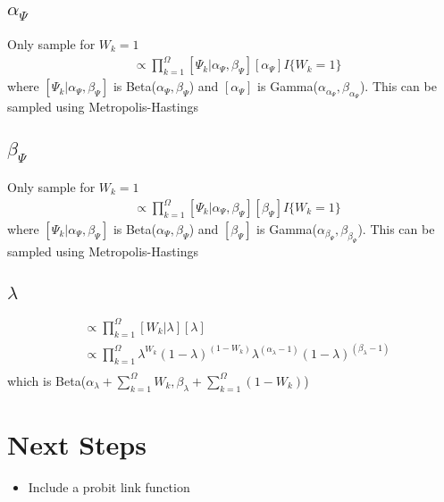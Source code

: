 \documentclass[fleqn]{article}
\begin{document}
\subsection{$\alpha_\Psi$}
%
Only sample for $W_k = 1$
%
\begin{align*}
  [\alpha_\Psi | \cdot] & \propto \prod_{k = 1}^\Omega [\Psi_k | \alpha_\Psi, \beta_\Psi] [\alpha_\Psi] I\{W_k = 1\}
\end{align*}
where $[\Psi_k | \alpha_\Psi, \beta_\Psi]$ is Beta($\alpha_\Psi, \beta_\Psi$) and $[\alpha_\Psi]$ is Gamma($\alpha_{\alpha_\Psi}, \beta_{\alpha_\Psi}$). This can be sampled using Metropolis-Hastings
%
\subsection{$\beta_\Psi$}
%
Only sample for $W_k = 1$
%
\begin{align*}
  [\beta_\Psi | \cdot] & \propto \prod_{k = 1}^\Omega [\Psi_k | \alpha_\Psi, \beta_\Psi] [\beta_\Psi] I\{W_k = 1\}
\end{align*}
where $[\Psi_k | \alpha_\Psi, \beta_\Psi]$ is Beta($\alpha_\Psi, \beta_\Psi$) and $[\beta_\Psi]$ is Gamma($\alpha_{\beta_\Psi}, \beta_{\beta_\Psi}$). This can be sampled using Metropolis-Hastings
%
\subsection{$\lambda$}
%
\begin{align*}
  [\lambda | \cdot ] & \propto \prod_{k = 1}^\Omega [W_k | \lambda] [\lambda]\\
  & \propto  \prod_{k = 1}^\Omega \lambda^{W_k} (1 - \lambda)^{(1 - W_k)} \lambda^{(\alpha_\lambda - 1)} (1 - \lambda)^{(\beta_\lambda - 1)}\\
\end{align*}
%
which is Beta($\alpha_\lambda + \sum_{k = 1}^\Omega W_k, \beta_\lambda + \sum_{k = 1}^\Omega (1 - W_k)$)
%
\section{Next Steps}
\begin{itemize}
  \item Include a probit link function
\end{itemize}
\end{document}
